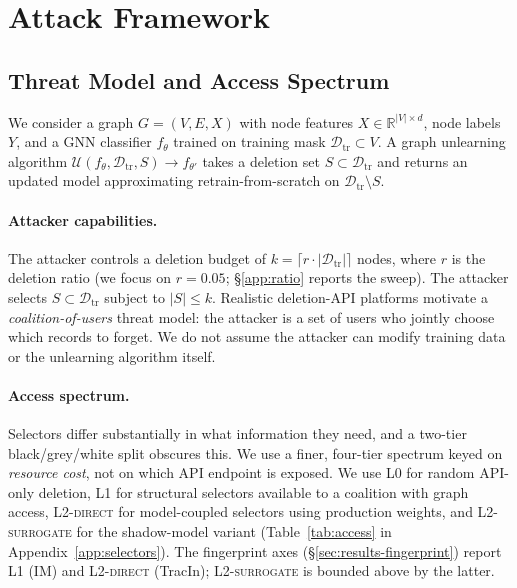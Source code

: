 \section{Attack Framework}
\label{sec:method}

\subsection{Threat Model and Access Spectrum}
\label{sec:threat-model}

We consider a graph $G=(V,E,X)$ with node features
$X\in\mathbb{R}^{|V|\times d}$, node labels $Y$, and a GNN classifier
$f_\theta$ trained on training mask
$\mathcal{D}_{\mathrm{tr}}\subset V$. A graph unlearning algorithm
$\mathcal{U}(f_\theta,\mathcal{D}_{\mathrm{tr}},S)\to f_{\theta'}$ takes a
deletion set $S\subset\mathcal{D}_{\mathrm{tr}}$ and returns an updated
model approximating retrain-from-scratch on
$\mathcal{D}_{\mathrm{tr}}\setminus S$.

\paragraph{Attacker capabilities.}
The attacker controls a deletion budget of
$k=\lceil r\cdot|\mathcal{D}_{\mathrm{tr}}|\rceil$ nodes, where $r$ is the
deletion ratio (we focus on $r=0.05$; \S\ref{app:ratio} reports the sweep).
The attacker selects $S\subset\mathcal{D}_{\mathrm{tr}}$ subject to
$|S|\le k$. Realistic deletion-API platforms motivate a
\emph{coalition-of-users} threat model: the attacker is a set of users who
jointly choose which records to forget. We do not assume the attacker can
modify training data or the unlearning algorithm itself.

\paragraph{Access spectrum.}
Selectors differ substantially in what information they need, and a
two-tier black/grey/white split obscures this. We use a finer, four-tier
spectrum keyed on \emph{resource cost}, not on which API endpoint is
exposed. We use L0 for random API-only deletion, L1 for structural
selectors available to a coalition with graph access, L2-\textsc{direct}
for model-coupled selectors using production weights, and
L2-\textsc{surrogate} for the shadow-model variant (Table~\ref{tab:access}
in Appendix~\ref{app:selectors}). The fingerprint axes
(\S\ref{sec:results-fingerprint}) report L1 (IM) and L2-\textsc{direct}
(TracIn); L2-\textsc{surrogate} is bounded above by the latter.

